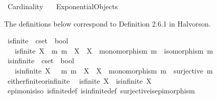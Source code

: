 %
\begin{isabellebody}%
%
%
\isadelimdocument
%
\endisadelimdocument
%
\isatagdocument
%
\isamarkuptrue%
%
\endisatagdocument
{\isafolddocument}%
%
\isadelimdocument
%
\endisadelimdocument
%
\isadelimtheory
%
\endisadelimtheory
%
\isatagtheory
{}\isamarkupfalse%
\ Cardinality\isanewline
\ \ \ Exponential{\isacharunderscore}{\kern0pt}Objects\isanewline
{}%
\endisatagtheory
{\isafoldtheory}%
%
\isadelimtheory
%
\endisadelimtheory
%
\begin{isamarkuptext}%
The definitions below correspond to Definition 2.6.1 in Halvorson.%
\end{isamarkuptext}\isamarkuptrue%
\isamarkupfalse%
\ is{\isacharunderscore}{\kern0pt}finite\ {\isacharcolon}{\kern0pt}{\isacharcolon}{\kern0pt}\ {\isachardoublequoteopen}cset\ {\isasymRightarrow}\ bool{\isachardoublequoteclose}\ \ \isanewline
\ \ \ {\isachardoublequoteopen}is{\isacharunderscore}{\kern0pt}finite\ X\ {\isasymlongleftrightarrow}\ {\isacharparenleft}{\kern0pt}{\isasymforall}m{\isachardot}{\kern0pt}\ {\isacharparenleft}{\kern0pt}m\ {\isacharcolon}{\kern0pt}\ X\ {\isasymrightarrow}\ X\ {\isasymand}\ monomorphism\ m{\isacharparenright}{\kern0pt}\ {\isasymlongrightarrow}\ isomorphism\ m{\isacharparenright}{\kern0pt}{\isachardoublequoteclose}\isanewline
\isanewline
{}\isamarkupfalse%
\ is{\isacharunderscore}{\kern0pt}infinite\ {\isacharcolon}{\kern0pt}{\isacharcolon}{\kern0pt}\ {\isachardoublequoteopen}cset\ {\isasymRightarrow}\ bool{\isachardoublequoteclose}\ \ \isanewline
\ \ \ {\isachardoublequoteopen}is{\isacharunderscore}{\kern0pt}infinite\ X\ {\isasymlongleftrightarrow}\ {\isacharparenleft}{\kern0pt}{\isasymexists}\ m{\isachardot}{\kern0pt}\ m\ {\isacharcolon}{\kern0pt}\ X\ {\isasymrightarrow}\ X\ {\isasymand}\ monomorphism\ m\ {\isasymand}\ {\isasymnot}surjective\ m{\isacharparenright}{\kern0pt}{\isachardoublequoteclose}\isanewline
\isanewline
{}\isamarkupfalse%
\ either{\isacharunderscore}{\kern0pt}finite{\isacharunderscore}{\kern0pt}or{\isacharunderscore}{\kern0pt}infinite{\isacharcolon}{\kern0pt}\isanewline
\ \ {\isachardoublequoteopen}is{\isacharunderscore}{\kern0pt}finite\ X\ {\isasymor}\ is{\isacharunderscore}{\kern0pt}infinite\ X{\isachardoublequoteclose}\isanewline
%
\isadelimproof
\ \ %
\endisadelimproof
%
\isatagproof
{}\isamarkupfalse%
\ epi{\isacharunderscore}{\kern0pt}mon{\isacharunderscore}{\kern0pt}is{\isacharunderscore}{\kern0pt}iso\ is{\isacharunderscore}{\kern0pt}finite{\isacharunderscore}{\kern0pt}def\ is{\isacharunderscore}{\kern0pt}infinite{\isacharunderscore}{\kern0pt}def\ surjective{\isacharunderscore}{\kern0pt}is{\isacharunderscore}{\kern0pt}epimorphism\ \isamarkupfalse%

\end{isabellebody}
